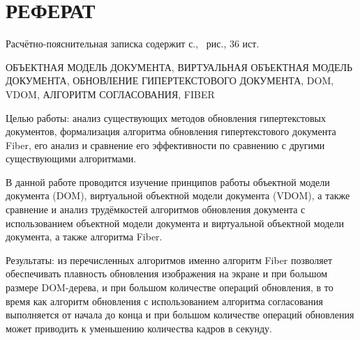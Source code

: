 \section*{РЕФЕРАТ}

Расчётно-пояснительная записка содержит \pageref{LastPage} с., \totalfigures\ рис., 36 ист.

ОБЪЕКТНАЯ МОДЕЛЬ ДОКУМЕНТА, ВИРТУАЛЬНАЯ ОБЪЕКТНАЯ МОДЕЛЬ ДОКУМЕНТА, ОБНОВЛЕНИЕ ГИПЕРТЕКСТОВОГО ДОКУМЕНТА, DOM, VDOM, АЛГОРИТМ СОГЛАСОВАНИЯ, FIBER

Целью работы: анализ существующих методов обновления гипертекстовых документов, формализация алгоритма обновления гипертекстового документа Fiber, его анализ и сравнение его эффективности по сравнению с другими существующими алгоритмами.

В данной работе проводится изучение принципов работы объектной модели документа (DOM), виртуальной объектной модели документа (VDOM), а также сравнение и анализ трудёмкостей алгоритмов обновления документа с использованием объектной модели документа и виртуальной объектной модели документа, а также алгоритма Fiber.

Результаты: из перечисленных алгоритмов именно алгоритм Fiber позволяет обеспечивать плавность обновления изображения на экране и при большом размере DOM-дерева, и при большом количестве операций обновления, в то время как алгоритм обновления с использованием алгоритма согласования выполняется от начала до конца и при большом количестве операций обновления может приводить к уменьшению количества кадров в секунду.

\pagebreak